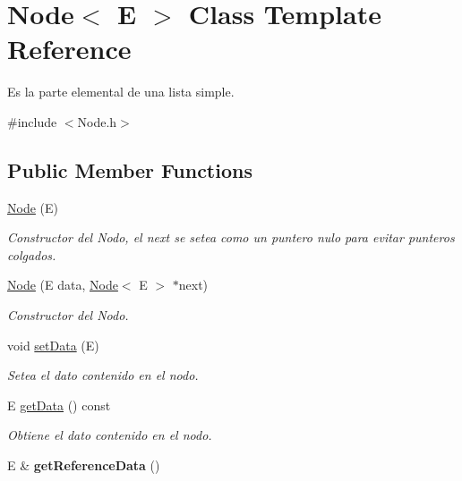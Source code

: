 \hypertarget{class_node}{\section{Node$<$ E $>$ Class Template Reference}
\label{class_node}
}


Es la parte elemental de una lista simple.  




{\ttfamily \#include $<$Node.\-h$>$}

\subsection*{Public Member Functions}
\begin{DoxyCompactItemize}
\item 
\hyperlink{class_node_a74d41f93c30d8c3036d24894f0e4314e}{Node} (E)
\begin{DoxyCompactList}\small\item\em Constructor del Nodo, el next se setea como un puntero nulo para evitar punteros colgados. \end{DoxyCompactList}\item 
\hyperlink{class_node_adc1b4c81c3fb6d0580f138650629a41e}{Node} (E data, \hyperlink{class_node}{Node}$<$ E $>$ $\ast$next)
\begin{DoxyCompactList}\small\item\em Constructor del Nodo. \end{DoxyCompactList}\item 
void \hyperlink{class_node_ae13418a552fa36eddbaa5dfb767aa664}{set\-Data} (E)
\begin{DoxyCompactList}\small\item\em Setea el dato contenido en el nodo. \end{DoxyCompactList}\item 
E \hyperlink{class_node_a02a4e5126542aaa1a2150932cfa2b8ce}{get\-Data} () const 
\begin{DoxyCompactList}\small\item\em Obtiene el dato contenido en el nodo. \end{DoxyCompactList}\item 
\hypertarget{class_node_adec417c9f6f7d2cbd0fc7a72508e9c3d}{E \& {\bfseries get\-Reference\-Data} ()}\label{class_node_adec417c9f6f7d2cbd0fc7a72508e9c3d}


\end{DoxyCompactItemize}
